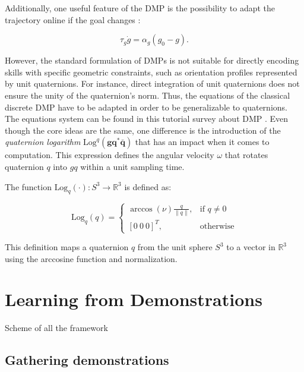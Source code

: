 \documentclass[conference]{IEEEtran}
\begin{document}
Additionally, one useful feature of the DMP is the possibility to adapt the trajectory online if the goal changes \cite{ijspeert_dynamical_2013}:

\begin{equation}
\tau_g \dot{g} = \alpha_g (g_0 - g). 
\end{equation}

However, the standard formulation of DMPs is not suitable for directly encoding skills with specific geometric constraints, such as orientation profiles represented by unit quaternions. For instance, direct integration of unit quaternions does not ensure the unity of the quaternion's norm. Thus, the equations of the classical discrete DMP have to be adapted in order to be generalizable to quaternions. The equations system can be found in this tutorial survey about DMP \cite{saveriano_dynamic_2021}. Even though the core ideas are the same, one difference is the introduction of the \emph{quaternion logarithm} \(\text{Log}^q (\boldsymbol{gq}^* \boldsymbol{\bar{q}})\) that has an impact when it comes to computation. This expression defines the angular velocity \(\omega\) that rotates quaternion \(q\) into \(gq\) within a unit sampling time.

The function \(\text{Log}_q(\cdot) : S^3 \rightarrow \mathbb{R}^3\) is defined as:

\[
\text{Log}_q(q) = \begin{cases}
\arccos(\nu) \frac{q}{\|q\|}, & \text{if } q \neq 0 \\
[0 \ 0 \ 0]^T, & \text{otherwise}
\end{cases}
\]

This definition maps a quaternion \(q\) from the unit sphere \(S^3\) to a vector in \(\mathbb{R}^3\) using the arccosine function and normalization. 

\section{Learning from Demonstrations} \label{LfD}

Scheme of all the framework

\subsection{Gathering demonstrations}
\end{document}
